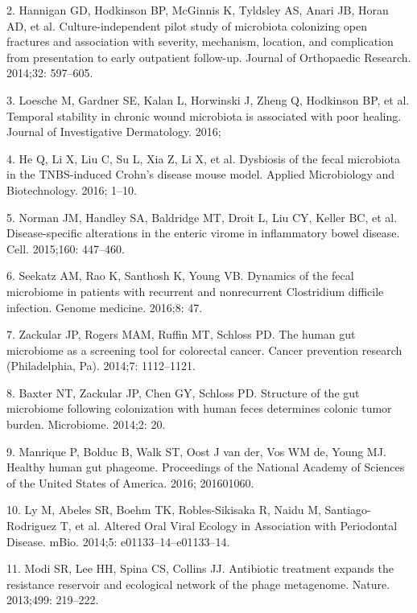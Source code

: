 \documentclass[12pt,]{article}
\begin{document}
\hypertarget{ref-Hannigan:2014be}{}
2. Hannigan GD, Hodkinson BP, McGinnis K, Tyldsley AS, Anari JB, Horan
AD, et al. Culture-independent pilot study of microbiota colonizing open
fractures and association with severity, mechanism, location, and
complication from presentation to early outpatient follow-up. Journal of
Orthopaedic Research. 2014;32: 597--605.

\hypertarget{ref-Loesche:2016ev}{}
3. Loesche M, Gardner SE, Kalan L, Horwinski J, Zheng Q, Hodkinson BP,
et al. Temporal stability in chronic wound microbiota is associated with
poor healing. Journal of Investigative Dermatology. 2016;

\hypertarget{ref-He:2016ch}{}
4. He Q, Li X, Liu C, Su L, Xia Z, Li X, et al. Dysbiosis of the fecal
microbiota in the TNBS-induced Crohn's disease mouse model. Applied
Microbiology and Biotechnology. 2016; 1--10.

\hypertarget{ref-Norman:2015kb}{}
5. Norman JM, Handley SA, Baldridge MT, Droit L, Liu CY, Keller BC, et
al. Disease-specific alterations in the enteric virome in inflammatory
bowel disease. Cell. 2015;160: 447--460.

\hypertarget{ref-Seekatz:2016fz}{}
6. Seekatz AM, Rao K, Santhosh K, Young VB. Dynamics of the fecal
microbiome in patients with recurrent and nonrecurrent Clostridium
difficile infection. Genome medicine. 2016;8: 47.

\hypertarget{ref-Zackular:2014fba}{}
7. Zackular JP, Rogers MAM, Ruffin MT, Schloss PD. The human gut
microbiome as a screening tool for colorectal cancer. Cancer prevention
research (Philadelphia, Pa). 2014;7: 1112--1121.

\hypertarget{ref-Baxter:2014hb}{}
8. Baxter NT, Zackular JP, Chen GY, Schloss PD. Structure of the gut
microbiome following colonization with human feces determines colonic
tumor burden. Microbiome. 2014;2: 20.

\hypertarget{ref-Manrique:2016dx}{}
9. Manrique P, Bolduc B, Walk ST, Oost J van der, Vos WM de, Young MJ.
Healthy human gut phageome. Proceedings of the National Academy of
Sciences of the United States of America. 2016; 201601060.

\hypertarget{ref-Ly:2014ew}{}
10. Ly M, Abeles SR, Boehm TK, Robles-Sikisaka R, Naidu M,
Santiago-Rodriguez T, et al. Altered Oral Viral Ecology in Association
with Periodontal Disease. mBio. 2014;5: e01133--14--e01133--14.

\hypertarget{ref-Modi:2013fia}{}
11. Modi SR, Lee HH, Spina CS, Collins JJ. Antibiotic treatment expands
the resistance reservoir and ecological network of the phage metagenome.
Nature. 2013;499: 219--222.
\end{document}
